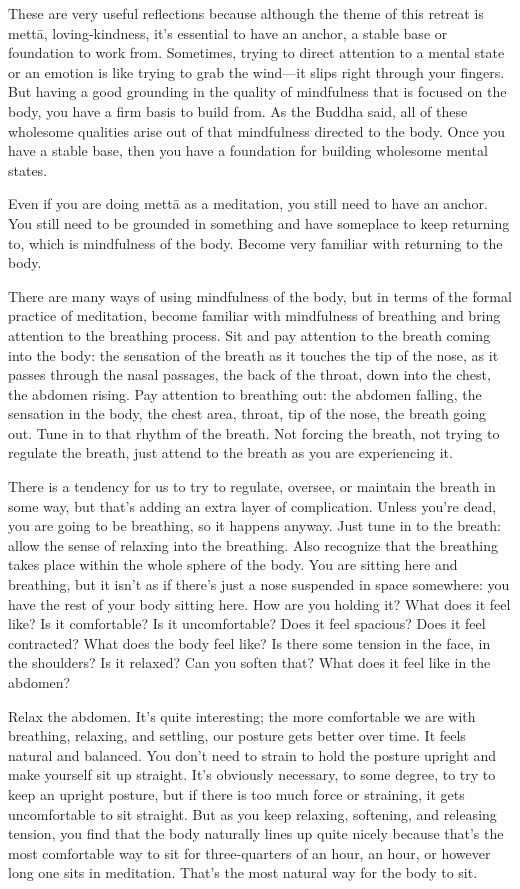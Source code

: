 These are very useful reflections because although the theme of this
retreat is mettā, loving-kindness, it’s essential to have an anchor, a
stable base or foundation to work from. Sometimes, trying to direct
attention to a mental state or an emotion is like trying to grab the
wind—it slips right through your fingers. But having a good grounding in
the quality of mindfulness that is focused on the body, you have a firm
basis to build from. As the Buddha said, all of these wholesome
qualities arise out of that mindfulness directed to the body. Once you
have a stable base, then you have a foundation for building wholesome
mental states.

Even if you are doing mettā as a meditation, you still need to have an
anchor. You still need to be grounded in something and have someplace to
keep returning to, which is mindfulness of the body. Become very
familiar with returning to the body.

There are many ways of using mindfulness of the body, but in terms of
the formal practice of meditation, become familiar with mindfulness of
breathing and bring attention to the breathing process. Sit and pay
attention to the breath coming into the body: the sensation of the
breath as it touches the tip of the nose, as it passes through the nasal
passages, the back of the throat, down into the chest, the abdomen
rising. Pay attention to breathing out: the abdomen falling, the
sensation in the body, the chest area, throat, tip of the nose, the
breath going out. Tune in to that rhythm of the breath. Not forcing the
breath, not trying to regulate the breath, just attend to the breath as
you are experiencing it.

There is a tendency for us to try to regulate, oversee, or maintain the
breath in some way, but that’s adding an extra layer of complication.
Unless you’re dead, you are going to be breathing, so it happens anyway.
Just tune in to the breath: allow the sense of relaxing into the
breathing. Also recognize that the breathing takes place within the
whole sphere of the body. You are sitting here and breathing, but it
isn’t as if there’s just a nose suspended in space somewhere: you have
the rest of your body sitting here. How are you holding it? What does it
feel like? Is it comfortable? Is it uncomfortable? Does it feel
spacious? Does it feel contracted? What does the body feel like? Is
there some tension in the face, in the shoulders? Is it relaxed? Can you
soften that? What does it feel like in the abdomen?

Relax the abdomen. It’s quite interesting; the more comfortable we are
with breathing, relaxing, and settling, our posture gets better over
time. It feels natural and balanced. You don’t need to strain to hold
the posture upright and make yourself sit up straight. It’s obviously
necessary, to some degree, to try to keep an upright posture, but if
there is too much force or straining, it gets uncomfortable to sit
straight. But as you keep relaxing, softening, and releasing tension,
you find that the body naturally lines up quite nicely because that’s
the most comfortable way to sit for three-quarters of an hour, an hour,
or however long one sits in meditation. That’s the most natural way for
the body to sit.

